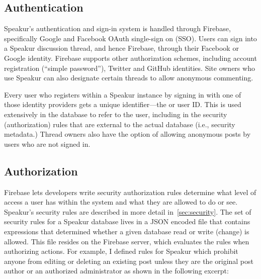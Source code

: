 \subsection{Authentication}
Speakur's authentication and sign-in system is handled through Firebase, 
specifically Google and Facebook OAuth single-sign on (SSO).
Users can sign into a Speakur discussion thread, and hence Firebase, through their Facebook or Google identity.
Firebase supports other authorization schemes, including account registration (``simple password''), Twitter and GitHub identities.
Site owners who use Speakur can also designate certain threads to allow anonymous commenting.

Every user who registers within a Speakur instance by signing in with one of those identity providers gets a unique identifier---the  or user ID. 
This  is used extensively in the database to refer to the user, including in the security (authorization) rules that are external to the actual database (i.e., security metadata.) 
Thread owners also have the option of allowing anonymous posts by users who are not signed in.

\subsection{Authorization}
Firebase lets developers write security authorization rules determine what level of access a user has within the system and what they are allowed to do or see.
Speakur's security rules are described in more detail in~\cref{sec:security}.
The set of security rules for a Speakur database lives in a JSON encoded file that contains expressions that determined whether a given database read or write (change) is allowed. 
This file resides on the Firebase server, which evaluates the rules when authorizing actions.
For example, I defined rules for Speakur which prohibit anyone from editing or deleting an existing post unless they are the original post author or an authorized administrator as shown in the following excerpt:

